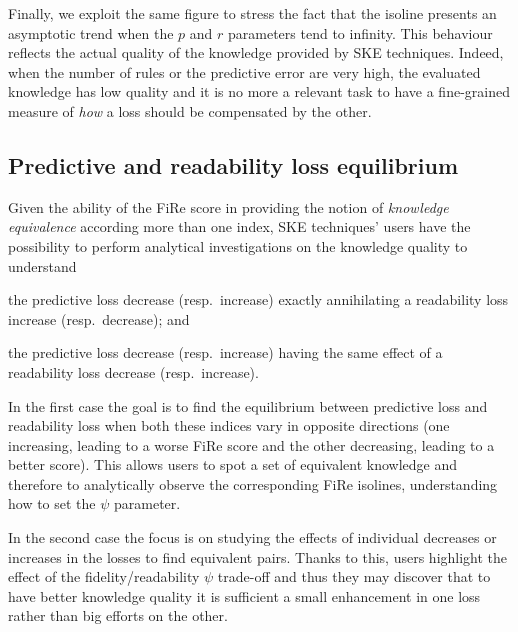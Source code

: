 \documentclass{article}
\newcommand{\fire}{FiRe}
\newenvironment{inlinelist}{\begin{enumerate*}[label=\emph{(\roman{*})}]}{\end{enumerate*}}
\begin{document}
Finally, we exploit the same figure to stress the fact that the isoline presents an asymptotic trend when the $p$ and $r$ parameters tend to infinity.
%
This behaviour reflects the actual quality of the knowledge provided by SKE techniques.
%
Indeed, when the number of rules or the predictive error are very high, the evaluated knowledge has low quality and it is no more a relevant task to have a fine-grained measure of \emph{how} a loss should be compensated by the other.

\subsection{Predictive and readability loss equilibrium}\label{ssec:balance}

Given the ability of the \fire{} score in providing the notion of \emph{knowledge equivalence} according more than one index, SKE techniques' users have the possibility to perform analytical investigations on the knowledge quality to understand
%
\begin{inlinelist}
	\item the predictive loss decrease (resp.\ increase) exactly annihilating a readability loss increase (resp.\ decrease); and
	\item the predictive loss decrease (resp.\ increase) having the same effect of a readability loss decrease (resp.\ increase).
\end{inlinelist}

In the first case the goal is to find the equilibrium between predictive loss and readability loss when both these indices vary in opposite directions (one increasing, leading to a worse \fire{} score and the other decreasing, leading to a better score).
%
This allows users to spot a set of equivalent knowledge and therefore to analytically observe the corresponding \fire{} isolines, understanding how to set the $\psi$ parameter.

In the second case the focus is on studying the effects of individual decreases or increases in the losses to find equivalent pairs.
%
Thanks to this, users highlight the effect of the fidelity/readability $\psi$ trade-off and thus they may discover that to have better knowledge quality it is sufficient a small enhancement in one loss rather than big efforts on the other.
\end{document}

